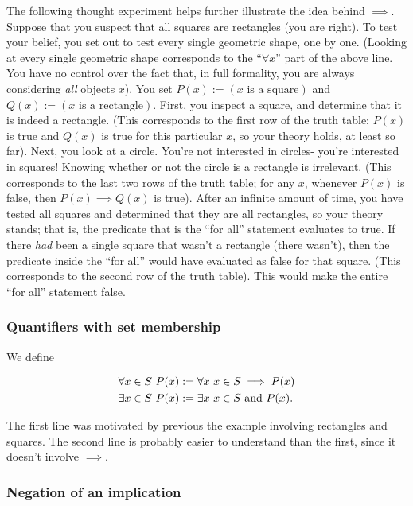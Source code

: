 The following thought experiment helps further illustrate the idea behind $\implies$. Suppose that you suspect that all squares are rectangles (you are right). To test your belief, you set out to test every single geometric shape, one by one. (Looking at every single geometric shape corresponds to the ``$\forall x$'' part of the above line. You have no control over the fact that, in full formality, you are always considering \textit{all} objects $x$). You set $P(x) := (\text{$x$ is a square})$ and $Q(x) := (\text{$x$ is a rectangle})$. First, you inspect a square, and determine that it is indeed a rectangle. (This corresponds to the first row of the truth table; $P(x)$ is true and $Q(x)$ is true for this particular $x$, so your theory holds, at least so far). Next, you look at a circle. You're not interested in circles- you're interested in squares! Knowing whether or not the circle is a rectangle is irrelevant. (This corresponds to the last two rows of the truth table; for any $x$, whenever $P(x)$ is false, then $P(x) \implies Q(x)$ is true). After an infinite amount of time, you have tested all squares and determined that they are all rectangles, so your theory stands; that is, the predicate that is the ``for all'' statement evaluates to true. If there \textit{had} been a single square that wasn't a rectangle (there wasn't), then the predicate inside the ``for all'' would have evaluated as false for that square. (This corresponds to the second row of the truth table). This would make the entire ``for all'' statement false.

\subsubsection*{Quantifiers with set membership}

We define

\begin{align*}
    &\forall x \in S \text{ } P(x) := \forall x \text{ } x \in S \implies P(x) \\
    &\exists x \in S \text{ } P(x) := \exists x \text{ } x \in S \text{ and } P(x).
\end{align*}

The first line was motivated by previous the example involving rectangles and squares. The second line is probably easier to understand than the first, since it doesn't involve $\implies$.

\subsubsection*{Negation of an implication}

